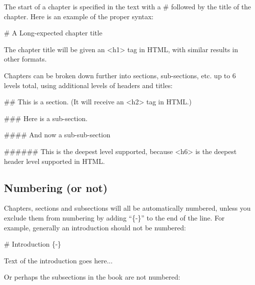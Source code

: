 \documentclass[
]{book}
\newenvironment{Shaded}{\begin{snugshade}}{\end{snugshade}}
\newcommand{\FunctionTok}[1]{\textcolor[rgb]{0.00,0.00,0.00}{#1}}
\newcommand{\NormalTok}[1]{#1}
\begin{document}
The start of a chapter is specified in the text with a \# followed by the title of the chapter. Here is an example of the proper syntax:

\begin{Shaded}
\begin{Highlighting}[]
\FunctionTok{\# A Long{-}expected chapter title}
\end{Highlighting}
\end{Shaded}

The chapter title will be given an \textless h1\textgreater{} tag in HTML, with similar results in other formats.

Chapters can be broken down further into sections, sub-sections, etc. up to 6 levels total, using additional levels of headers and titles:

\begin{Shaded}
\begin{Highlighting}[]
\FunctionTok{\#\# This is a section. (It will receive an \textless{}h2\textgreater{} tag in HTML.)}

\FunctionTok{\#\#\# Here is a sub{-}section.}

\FunctionTok{\#\#\#\# And now a sub{-}sub{-}section}

\FunctionTok{\#\#\#\#\#\# This is the deepest level supported, because \textless{}h6\textgreater{} is the deepest header level supported in HTML.}
\end{Highlighting}
\end{Shaded}

\hypertarget{numbering-or-not}{%
\subsection{Numbering (or not)}\label{numbering-or-not}}

Chapters, sections and subsections will all be automatically numbered, unless you exclude them from numbering by adding ``\{-\}'' to the end of the line. For example, generally an introduction should not be numbered:

\begin{Shaded}
\begin{Highlighting}[]
\FunctionTok{\# Introduction \{{-}\}}

\NormalTok{Text of the introduction goes here...}
\end{Highlighting}
\end{Shaded}

Or perhaps the subsections in the book are not numbered:
\end{document}
